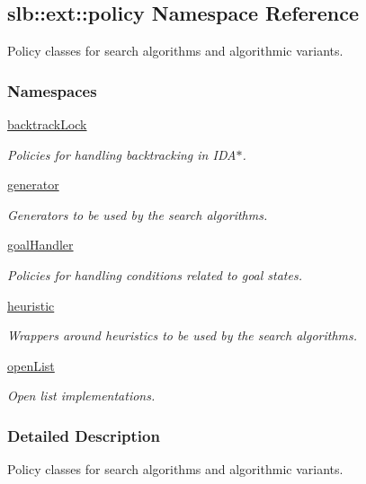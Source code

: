 \hypertarget{namespaceslb_1_1ext_1_1policy}{}\subsection{slb\+:\+:ext\+:\+:policy Namespace Reference}
\label{namespaceslb_1_1ext_1_1policy}


Policy classes for search algorithms and algorithmic variants.  


\subsubsection*{Namespaces}
\begin{DoxyCompactItemize}
\item 
 \hyperlink{namespaceslb_1_1ext_1_1policy_1_1backtrackLock}{backtrack\+Lock}
\begin{DoxyCompactList}\small\item\em Policies for handling backtracking in I\+D\+A$\ast$. \end{DoxyCompactList}\item 
 \hyperlink{namespaceslb_1_1ext_1_1policy_1_1generator}{generator}
\begin{DoxyCompactList}\small\item\em Generators to be used by the search algorithms. \end{DoxyCompactList}\item 
 \hyperlink{namespaceslb_1_1ext_1_1policy_1_1goalHandler}{goal\+Handler}
\begin{DoxyCompactList}\small\item\em Policies for handling conditions related to goal states. \end{DoxyCompactList}\item 
 \hyperlink{namespaceslb_1_1ext_1_1policy_1_1heuristic}{heuristic}
\begin{DoxyCompactList}\small\item\em Wrappers around heuristics to be used by the search algorithms. \end{DoxyCompactList}\item 
 \hyperlink{namespaceslb_1_1ext_1_1policy_1_1openList}{open\+List}
\begin{DoxyCompactList}\small\item\em Open list implementations. \end{DoxyCompactList}\end{DoxyCompactItemize}


\subsubsection{Detailed Description}
Policy classes for search algorithms and algorithmic variants. 
